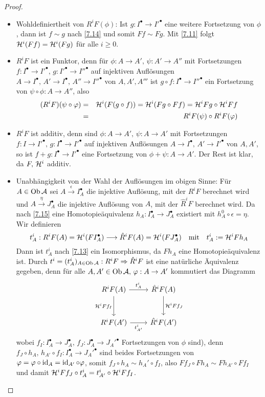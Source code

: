 \begin{proof}
	\begin{itemize}
		\item Wohldefiniertheit von $R^iF(\phi)$: Ist $g:I^\bullet\to I'^\bullet$ eine weitere Fortsetzung von $\phi$, dann ist $f \sim g$ nach \ref{7.14} und somit $Ff\sim Fg$. Mit \ref{7.11} folgt $\mathcal{H}^i(Ff) = \mathcal{H}^i(Fg)$ für alle $i\geq 0$.
		\item $R^iF$ ist ein Funktor, denn für $\phi:A \to A', \, \psi:A' \to A''$ mit Fortsetzungen $f:I^\bullet\to I'^\bullet, \, g:I'^\bullet \to I''^\bullet$ auf injektiven Auflösungen $A\to I^\bullet, \, A'\to I^\bullet, \, A'' \to I''^\bullet$ von $A,A',A'''$ ist $g\circ f:I^\bullet\to I''^\bullet$ ein Fortsetzung von $\psi \circ \phi:A \to A''$, also 
		\begin{eqnarray*}
			(R^iF)(\psi \circ \varphi) &=& \mathcal{H}^i(F(g\circ f)) = \mathcal{H}^i(Fg\circ Ff) = \mathcal{H}^iFg \circ \mathcal{H}^iFf\\
			& =& R^iF(\psi) \circ R^iF(\varphi)
		\end{eqnarray*}
		\item $R^iF$ ist additiv, denn sind $\phi:A\to A', \, \psi :A \to A'$ mit Fortsetzungen $f:I \to I'^\bullet, \, g:I^\bullet\to I'^\bullet$ auf injektiven Auflösungen $A\to I^\bullet, \, A' \to I'^\bullet$ von $A, A'$, so ist $f+g :I^\bullet\to I'^\bullet$ eine Fortsetzung von $\phi + \psi:A\to A'$. Der Rest ist klar, da $F, \,\mathcal{H}^i$ additiv.
		\item Unabhängigkeit von der Wahl der Auflösungen im obigen Sinne: Für $A\in \text{Ob}\,\mathcal{A}$ sei $A\xrightarrow{\epsilon} I_A^\bullet$ die injektive Auflösung, mit der $R^iF$ berechnet wird und $A\xrightarrow{\eta} J_A^\bullet$ die injektive Auflösung von $A$, mit der $\hat R^i F$ berechnet wird. Da nach \ref{7.15} eine Homotopieäquivalenz $h_A:I_A^\bullet\to J_A^\bullet$ existiert mit $h_A^0 \circ \epsilon = \eta$. Wir definieren
		$$t_A^i:R^iF(A) = \mathcal{H}^i(FI_A^\bullet)\longrightarrow \hat R^iF(A) = \mathcal{H}^i(FJ_A^\bullet) \quad \text{mit} \quad t_A^i:= \mathcal{H}^iFh_A$$
		Dann ist $t^i_A$ nach \ref{7.13} ein Isomorphismus, da $Fh_A$ eine Homotopieäquivalenz ist. Durch $t^i=(t_A^i)_{A\in \text{Ob}\,\mathcal{A}}:R^iF\Rightarrow \hat R^iF$ ist eine natürliche Äquivalenz gegeben, denn für alle $A,A'\in \text{Ob}\,\mathcal{A}, \, \varphi:A \to A'$ kommutiert das Diagramm
		$$\begin{tikzcd}[row sep = large]
		R^iF(A) \arrow{r}{t_A^i} \arrow[swap]{d}{\HH^iFf_I} & \hat R^iF(A) \arrow{d}{\HH^iFf_J}\\
		R^iF(A') \arrow[swap]{r}{t^i_{A'}} & \hat R^iF(A')
		\end{tikzcd}$$
		wobei $f_I:I_A^\bullet\to J_A^\bullet, \, f_J:J_A^\bullet \to J_A'^\bullet$ Fortsetzungen von $\phi$ sind), denn $f_J \circ h_A, \, h_{A'} \circ f_I: I_A^\bullet \to J_A'^{\bullet}$ sind beides Fortsetzungen von $\varphi=\varphi \circ \operatorname{id}_A = \operatorname{id}_{A'} \circ \varphi$, somit $f_J \circ h_A \sim h_A' \circ f_I$, also $Ff_J \circ Fh_A \sim Fh_{A'} \circ Ff_I$ und damit $\mathcal{H}^iFf_J \circ t^i_A = t^i_{A'} \circ \mathcal{H}^iFf_I$.
	\end{itemize}
\end{proof}
